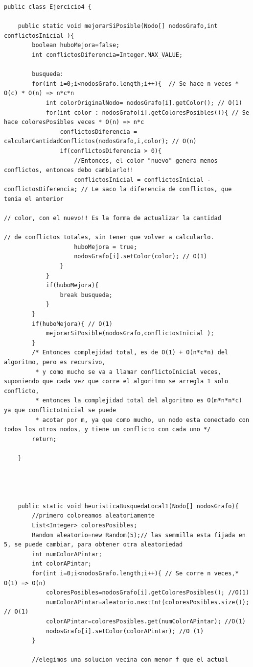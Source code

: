 \documentclass[a4paper]{article}
\begin{document}
\begin{lstlisting}
public class Ejercicio4 {
	
	public static void mejorarSiPosible(Nodo[] nodosGrafo,int conflictosInicial ){
		boolean huboMejora=false;
		int conflictosDiferencia=Integer.MAX_VALUE;
		
		busqueda:
		for(int i=0;i<nodosGrafo.length;i++){  // Se hace n veces * O(c) * O(n) => n*c*n 
			int colorOriginalNodo= nodosGrafo[i].getColor(); // O(1)
			for(int color : nodosGrafo[i].getColoresPosibles()){ // Se hace coloresPosibles veces * O(n) => n*c
				conflictosDiferencia = calcularCantidadConflictos(nodosGrafo,i,color); // O(n) 
				if(conflictosDiferencia > 0){
					//Entonces, el color "nuevo" genera menos conflictos, entonces debo cambiarlo!!
					conflictosInicial = conflictosInicial - conflictosDiferencia; // Le saco la diferencia de conflictos, que tenia el anterior
																				  // color, con el nuevo!! Es la forma de actualizar la cantidad
																				  // de conflictos totales, sin tener que volver a calcularlo.
					huboMejora = true;
					nodosGrafo[i].setColor(color); // O(1)
				}
			}
			if(huboMejora){
				break busqueda;
			}
		}
		if(huboMejora){ // O(1)
			mejorarSiPosible(nodosGrafo,conflictosInicial );
		}
		/* Entonces complejidad total, es de O(1) + O(n*c*n) del algoritmo, pero es recursivo,
		 * y como mucho se va a llamar conflictoInicial veces, suponiendo que cada vez que corre el algoritmo se arregla 1 solo conflicto, 
		 * entonces la complejidad total del algoritmo es O(m*n*n*c) ya que conflictoInicial se puede
		 * acotar por m, ya que como mucho, un nodo esta conectado con todos los otros nodos, y tiene un conflicto con cada uno */
		return;
		
	}
	
	
	

	public static void heuristicaBusquedaLocal1(Nodo[] nodosGrafo){
		//primero coloreamos aleatoriamente 
		List<Integer> coloresPosibles;
		Random aleatorio=new Random(5);// las semmilla esta fijada en 5, se puede cambiar, para obtener otra aleatoriedad
		int numColorAPintar;
		int colorAPintar;
		for(int i=0;i<nodosGrafo.length;i++){ // Se corre n veces,* O(1) => O(n)
			coloresPosibles=nodosGrafo[i].getColoresPosibles(); //O(1)
			numColorAPintar=aleatorio.nextInt(coloresPosibles.size()); // O(1)
			colorAPintar=coloresPosibles.get(numColorAPintar); //O(1)
			nodosGrafo[i].setColor(colorAPintar); //O (1)
		}
		
		//elegimos una solucion vecina con menor f que el actual
		

\end{lstlisting}
\end{document}
